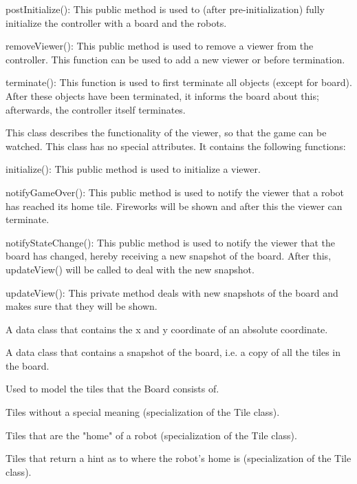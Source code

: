 \begin{description}
\begin{description}
            \item postInitialize(): This public method is used to (after pre-initialization) fully initialize the controller with a board and the robots.
            \item removeViewer(): This public method is used to remove a viewer from the controller. This function can be used to add a new viewer or before termination.
            \item terminate(): This function is used to first terminate all objects (except for board). After these objects have been terminated, it informs the board about this; afterwards, the controller itself terminates.
        \end{description}
        \item[Viewer] This class describes the functionality of the viewer, so that the game can be watched. This class has no special attributes. It contains the following functions:
        \begin{description}
            \item initialize(): This public method is used to initialize a viewer.
            \item notifyGameOver(): This public method is used to notify the viewer that a robot has reached its home tile. Fireworks will be shown and after this the viewer can terminate.
            \item notifyStateChange(): This public method is used to notify the viewer that the board has changed, hereby receiving a new snapshot of the board. After this, updateView() will be called to deal with the new snapshot.
            \item updateView(): This private method deals with new snapshots of the board and makes sure that they will be shown.
        \end{description}
        \item[AbsoluteCoord] A data class that contains the x and y coordinate of an absolute coordinate.
		\item[BoardSnapshot] A data class that contains a snapshot of the board, i.e. a copy of all the tiles in the board.
		\item[Tile] Used to model the tiles that the Board consists of.
		\item[NormalTile] Tiles without a special meaning (specialization of the Tile class).
		\item[HomeTile] Tiles that are the "home" of a robot (specialization of the Tile class).
		\item[HintTile] Tiles that return a hint as to where the robot's home is (specialization of the Tile class).

\end{description}
